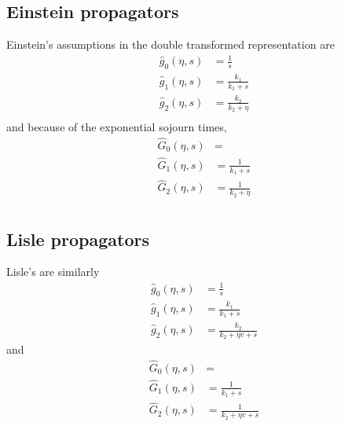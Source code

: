 \documentclass[11pt]{article}
\begin{document}
\subsection{Einstein propagators}
Einstein's assumptions in the double transformed representation are
\begin{align}
\hat{g}_0(\eta,s) &= \frac{1}{s} \\
\hat{g}_1(\eta,s) &= \frac{k_1}{k_1+s}\\
\hat{g}_2(\eta,s) &= \frac{k_2}{k_2 + \eta}\\
\end{align}
and because of the exponential sojourn times, 
\begin{align}
\hat{G}_0(\eta,s) &= \\
\hat{G}_1(\eta,s) &= \frac{1}{k_1 + s}\\
\hat{G}_2(\eta,s) &= \frac{1}{k_2 + \eta}\\
\end{align}
\subsection{Lisle propagators}
Lisle's are similarly
\begin{align}
\hat{g}_0(\eta,s) &= \frac{1}{s}\\
\hat{g}_1(\eta,s) &= \frac{k_1}{k_1+s}\\
\hat{g}_2(\eta,s) &= \frac{k_2}{k_2 + \eta v + s}
\end{align}
and
\begin{align}
\hat{G}_0(\eta,s) &= \\
\hat{G}_1(\eta,s) &= \frac{1}{k_1 + s}\\
\hat{G}_2(\eta,s) &= \frac{1}{k_2 + \eta v+ s}\\
\end{align}







\end{document}
